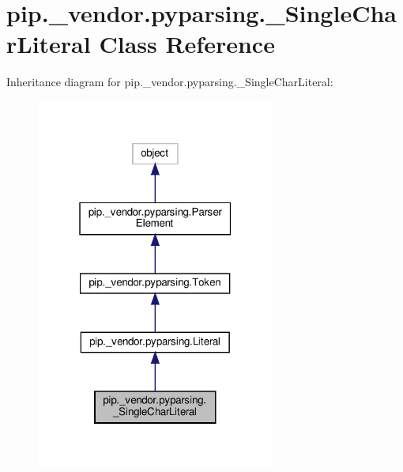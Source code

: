 \hypertarget{classpip_1_1__vendor_1_1pyparsing_1_1__SingleCharLiteral}{}\section{pip.\+\_\+vendor.\+pyparsing.\+\_\+\+Single\+Char\+Literal Class Reference}
\label{classpip_1_1__vendor_1_1pyparsing_1_1__SingleCharLiteral}


Inheritance diagram for pip.\+\_\+vendor.\+pyparsing.\+\_\+\+Single\+Char\+Literal\+:
\nopagebreak
\begin{figure}[H]
\begin{center}
\leavevmode
\includegraphics[width=223pt]{classpip_1_1__vendor_1_1pyparsing_1_1__SingleCharLiteral__inherit__graph}
\end{center}
\end{figure}


